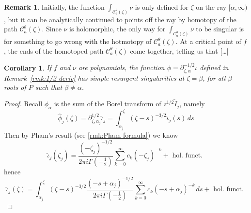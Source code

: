 \documentclass{article}
\newcommand{\series}[1]{\tilde{#1}}
\newcommand{\fracderiv}[3]{\partial^{#1}_{#2, #3}}
\theoremstyle{definition}
\newtheorem{remark}[definition]{Remark}
\theoremstyle{plain}
\newtheorem{corollary}[theorem]{Corollary}
\newenvironment{todo}{\color{Coral}}{\color{black}}
\newenvironment{revised}{\color{DarkBlue}}{\color{black}}
\begin{document}
\begin{remark}
\begin{revised}Initially, the function $\int_{\mathcal{C}^\theta_a(\zeta)} \nu$ is only defined for $\zeta$ on the ray $[\alpha, \infty)$, but it can be analytically continued to points off the ray by homotopy of the path $\mathcal{C}^\theta_a(\zeta)$. Since $\nu$ is holomorphic, the only way for $\int_{\mathcal{C}^\theta_a(\zeta)} \nu$ to be singular is for something to go wrong with the hotmotopy of $\mathcal{C}^\theta_a(\zeta)$. At a critical point of $f$, the ends of the homotoped path $\mathcal{C}^\theta_a(\zeta)$ come together, telling us that \begin{todo}[\ldots]\end{todo}\end{revised}
\end{remark}
\begin{todo}
\begin{corollary}\label{simple-res-thimble}
If $f$ and $\nu$ are polynomials, the function ${\phi}=\fracderiv{-1/2}{\zeta}{\alpha}\iota$ defined in Remark~\ref{rmk:1/2-deriv} has simple resurgent singularities at $\zeta=\beta$, for all $\beta$ roots of $P$ such that $\beta\neq\alpha$.  
\end{corollary}
\begin{proof}
Recall ${\phi}_\alpha$ is the sum of the Borel transform of $z^{1/2}\series{I}_j$, namely 
\[\hat{\phi}_j(\zeta)=\fracderiv{1/2}{\zeta}{\alpha_j}\hat{\iota}_j=\int_{\alpha_j}^\zeta(\zeta-s)^{-3/2}\hat{\iota}_j(s)\, ds\]
Then by Pham's result (see \eqref{rmk:Pham formula}) we know 
\[\hat{\iota}_j(\zeta_j)=\frac{(-\zeta_j)^{-1/2}}{2\pi i\Gamma(-\tfrac{1}{2})}\sum_{k=0}^\infty c_k (-\zeta_j)^{-k} + \text{ hol. funct. }\]
hence 
\[\hat{\iota}_j(\zeta)=\int_{\alpha_j}^\zeta(\zeta-s)^{-3/2}\frac{(-s+\alpha_j)^{-1/2}}{2\pi i\Gamma(-\tfrac{1}{2})}\sum_{k=0}^\infty c_k (-s+\alpha_j)^{-k} \, ds + \text{ hol. funct. }\]
\end{proof}
\end{todo}
\end{document}
